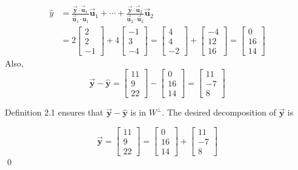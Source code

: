 \documentclass[letter,11pt]{article}
\theoremstyle{definition}
\begin{document}
\begin{tcolorbox}[boxrule=1mm,enhanced jigsaw, breakable,before=\hfill,after=\hfill,adjusted title={Problem 2 solution}]
    \begin{align*}
        \hat{y} &= \frac{\vec{\boldsymbol{y}} \cdot \vec{\boldsymbol{u}}_1}{\vec{\boldsymbol{u}}_1 \cdot \boldsymbol{u}_1} \vec{\boldsymbol{u}}_1+\cdots+\frac{\vec{\boldsymbol{y}} \cdot \vec{\boldsymbol{u}}_2}{\vec{\boldsymbol{u}}_2 \cdot \vec{\boldsymbol{u}}_2} \vec{\boldsymbol{u}}_2\\
        &= 2\begin{bmatrix} 2\\2\\-1\end{bmatrix} + 4\begin{bmatrix} -1\\3\\-4\end{bmatrix} =\begin{bmatrix} 4\\4\\-2\end{bmatrix}+\begin{bmatrix} -4\\12\\16\end{bmatrix} = \begin{bmatrix} 0\\16\\14\end{bmatrix}
    \end{align*}
    Also,
     $$\vec{\boldsymbol{y}} - \hat{\boldsymbol{y}} = \begin{bmatrix} 11\\9\\22\end{bmatrix} - \begin{bmatrix} 0\\16\\14\end{bmatrix} = \begin{bmatrix} 11\\-7\\8\end{bmatrix}$$
     
     Definition 2.1 ensures that $\vec{\boldsymbol{y}} - \hat{\boldsymbol{y}}$ is in $W^{\perp}$. The desired decomposition of $\vec{\boldsymbol{y}}$ is

     $$\boxed{\vec{\boldsymbol{y}} = \begin{bmatrix} 11\\9\\22\end{bmatrix} = \begin{bmatrix} 0\\16\\14\end{bmatrix}+\begin{bmatrix} 11\\-7\\8\end{bmatrix}}$$ \qed
\end{tcolorbox}
\end{document}
